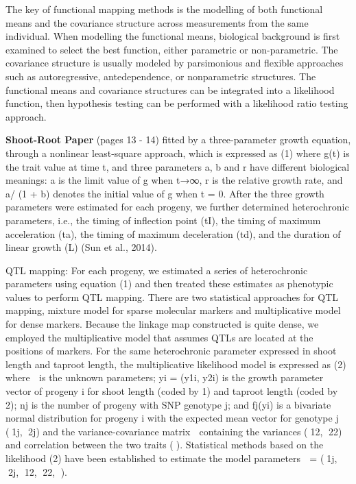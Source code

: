 \documentclass[]{book}
\theoremstyle{definition}
\theoremstyle{definition}
\theoremstyle{remark}
\begin{document}
The key of functional mapping methods is the modelling of both
functional means and the covariance structure across measurements from
the same individual. When modelling the functional means, biological
background is first examined to select the best function, either
parametric or non-parametric. The covariance structure is usually
modeled by parsimonious and flexible approaches such as autoregressive,
antedependence, or nonparametric structures. The functional means and
covariance structures can be integrated into a likelihood function, then
hypothesis testing can be performed with a likelihood ratio testing
approach.

\textbf{Shoot-Root Paper} (pages 13 - 14) fitted by a three-parameter
growth equation, through a nonlinear least-square approach, which is
expressed as (1) where g(t) is the trait value at time t, and three
parameters a, b and r have different biological meanings: a is the limit
value of g when t→∞, r is the relative growth rate, and a/ (1 + b)
denotes the initial value of g when t = 0. After the three growth
parameters were estimated for each progeny, we further determined
heterochronic parameters, i.e., the timing of inflection point (tI), the
timing of maximum acceleration (ta), the timing of maximum deceleration
(td), and the duration of linear growth (L) (Sun et al., 2014).

QTL mapping: For each progeny, we estimated a series of heterochronic
parameters using equation (1) and then treated these estimates as
phenotypic values to perform QTL mapping. There are two statistical
approaches for QTL mapping, mixture model for sparse molecular markers
and multiplicative model for dense markers. Because the linkage map
constructed is quite dense, we employed the multiplicative model that
assumes QTLs are located at the positions of markers. For the same
heterochronic parameter expressed in shoot length and taproot length,
the multiplicative likelihood model is expressed as (2) where  is the
unknown parameters; yi = (y1i, y2i) is the growth parameter vector of
progeny i for shoot length (coded by 1) and taproot length (coded by 2);
nj is the number of progeny with SNP genotype j; and fj(yi) is a
bivariate normal distribution for progeny i with the expected mean
vector for genotype j (1j, 2j) and the variance-covariance matrix 
containing the variances (12, 22) and correlation between the two
traits (). Statistical methods based on the likelihood (2) have been
established to estimate the model parameters  = (1j, 2j, 12, 22,
).
\end{document}
